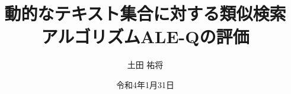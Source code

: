 
\algrenewcommand{}
\algrenewcommand{}
\newcommand{\abs}[1]{\lvert #1 \rvert}
\newcommand{\Break}{\textbf{break}}

\usepackage{wuse_thesis}



\title{動的なテキスト集合に対する類似検索\\アルゴリズムALE-Qの評価}  %

\author{土田 祐将}  %
\bachelar
{}   %
\date{令和4年1月31日}